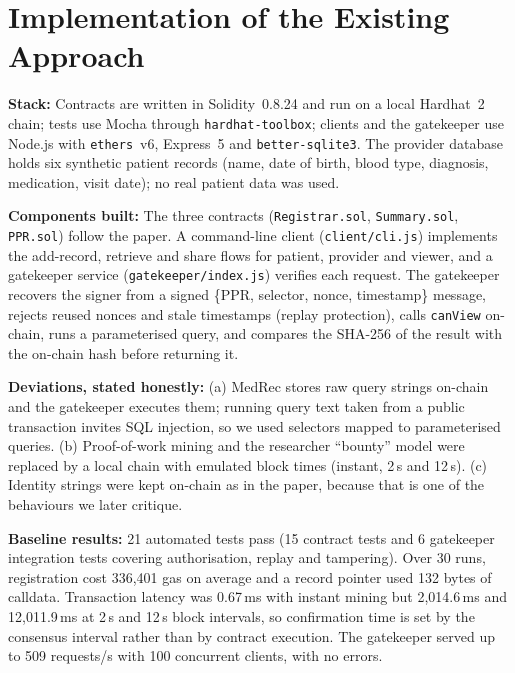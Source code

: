 \documentclass[11pt,a4paper]{article}
\begin{document}
\section{Implementation of the Existing Approach}
\textbf{Stack:} Contracts are written in Solidity~0.8.24 and run on a local Hardhat~2
chain; tests use Mocha through \texttt{hardhat-toolbox}; clients and the gatekeeper
use Node.js with \texttt{ethers}~v6, Express~5 and \texttt{better-sqlite3}. The
provider database holds six synthetic patient records (name, date of birth, blood
type, diagnosis, medication, visit date); no real patient data was used.

\textbf{Components built:} The three contracts (\texttt{Registrar.sol},
\texttt{Summary.sol}, \texttt{PPR.sol}) follow the paper. A command-line client
(\texttt{client/cli.js}) implements the add-record, retrieve and share flows for
patient, provider and viewer, and a gatekeeper service (\texttt{gatekeeper/index.js})
verifies each request. The gatekeeper recovers the
signer from a signed \{PPR, selector, nonce, timestamp\} message, rejects reused
nonces and stale timestamps (replay protection), calls \texttt{canView} on-chain,
runs a parameterised query, and compares the SHA-256 of the result with the on-chain
hash before returning it.

\textbf{Deviations, stated honestly:} (a) MedRec stores raw query strings on-chain
and the gatekeeper executes them; running query text taken from a public
transaction invites SQL injection, so we used selectors mapped to parameterised
queries. (b) Proof-of-work mining and the researcher ``bounty'' model were
replaced by a local chain with emulated block times (instant, 2\,s and 12\,s).
(c) Identity strings were kept on-chain as in the paper, because that is one of the
behaviours we later critique.

\textbf{Baseline results:} 21 automated tests pass (15 contract tests and 6
gatekeeper integration tests covering authorisation, replay and tampering). Over
30 runs, registration cost 336,401 gas on average and a record pointer used 132
bytes of calldata. Transaction latency was 0.67\,ms with instant mining but
2,014.6\,ms and 12,011.9\,ms at 2\,s and 12\,s block intervals, so confirmation time
is set by the consensus interval rather than by contract execution. The gatekeeper
served up to 509 requests/s with 100 concurrent clients, with no errors.
\end{document}
